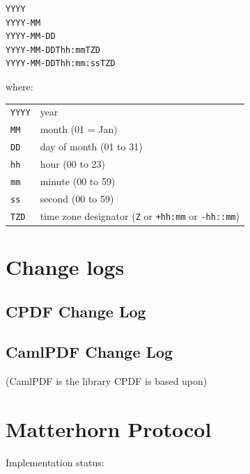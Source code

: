 \documentclass{book}
\begin{document}
\begin{verbatim}
YYYY
YYYY-MM
YYYY-MM-DD
YYYY-MM-DDThh:mmTZD
YYYY-MM-DDThh:mm:ssTZD
\end{verbatim}

\noindent where:

\medskip
\begin{tabular}{ll}
\texttt{YYYY} & year \\
\texttt{MM} & month (01 = Jan)\\
\texttt{DD} & day of month (01 to 31)\\
\texttt{hh} & hour (00 to 23)\\
\texttt{mm} & minute (00 to 59)\\
\texttt{ss} & second (00 to 59)\\
\texttt{TZD} & time zone designator (\texttt{Z} or \texttt{+hh:mm} or \texttt{-hh::mm})
\end{tabular}
\pagestyle{fancy}

\vfill
\ifdefined\HCode
\else
\chapter{Change logs}\pagestyle{empty}

\section{CPDF Change Log}
{\footnotesize\begin{alltt}

\end{alltt}}

\section{CamlPDF Change Log}
(CamlPDF is the library CPDF is based upon)

{\footnotesize\begin{alltt}

\end{alltt}}
\fi

\chapter{Matterhorn Protocol}\pagestyle{empty}

Implementation status:
\end{document}
